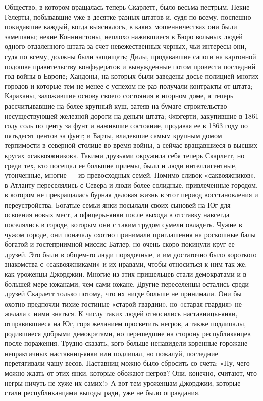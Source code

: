 Общество, в котором вращалась теперь Скарлетт, было весьма пестрым.
Некие Гелерты, побывавшие уже в десятке разных штатов и, судя по всему, поспешно покидавшие каждый, когда выяснялось, в каких мошенничествах они были замешаны; некие Коннингтоны, неплохо нажившиеся в Бюро вольных людей одного отдаленного штата за счет невежественных черных, чьи интересы они, судя по всему, должны были защищать; Дилы, продававшие сапоги на картонной подошве правительству конфедератов и вынужденные потом провести последний год войны в Европе; Хандоны, на которых были заведены досье полицией многих городов и которые тем не менее с успехом не раз получали контракты от штата; Караханы, заложившие основу своего состояния в игорном доме, а теперь рассчитывавшие на более крупный куш, затеяв на бумаге строительство несуществующей железной дороги на деньги штата; Флэгерти, закупившие в 1861 году соль по центу за фунт и нажившие состояние, продавая ее в 1863 году по пятьдесят центов за фунт; и Барты, владевшие самым крупным домом терпимости в северной столице во время войны, а сейчас вращавшиеся в высших кругах «саквояжников».
Такими друзьями окружила себя теперь Скарлетт, но среди тех, кто посещал ее большие приемы, были и люди интеллигентные, утонченные, многие — из превосходных семей. Помимо сливок «саквояжников», в Атланту переселялись с Севера и люди более солидные, привлеченные городом, в котором не прекращалась бурная деловая жизнь в этот период восстановления и переустройства. Богатые семьи янки посылали своих сыновей на Юг для освоения новых мест, а офицеры-янки после выхода в отставку навсегда поселялись в городе, которым они с таким трудом сумели овладеть. Чужие в чужом городе, они поначалу охотно принимали приглашения на роскошные балы богатой и гостеприимной миссис Батлер, но очень скоро покинули круг ее друзей. Это были в общем-то люди порядочные, и им достаточно было короткого знакомства с «саквояжниками» и их нравами, чтобы относиться к ним так же, как уроженцы Джорджии. Многие из этих пришельцев стали демократами и в большей мере южанами, чем сами южане.
Другие переселенцы остались среди друзей Скарлетт только потому, что их нигде больше не принимали. Они бы охотно предпочли тихие гостиные «старой гвардии», но «старая гвардия» не желала с ними знаться. К числу таких людей относились наставницы-янки, отправившиеся на Юг, горя желанием просветить негров, а также подлипалы, родившиеся добрыми демократами, но перешедшие на сторону республиканцев после поражения.
Трудно сказать, кого больше ненавидели коренные горожане — непрактичных наставниц-янки или подлипал, но пожалуй, последние перетягивали чашу весов. Наставниц можно было сбросить со счета: «Ну, чего можно ждать от этих янки, которые обожают негров? Они, конечно, считают, что негры ничуть не хуже их самих!» А вот тем уроженцам Джорджии, которые стали республиканцами выгоды ради, уже не было оправдания.
